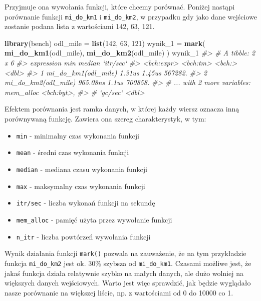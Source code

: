 \documentclass[paper=6in:9in,pagesize=pdftex,headinclude=on,footinclude=on,10pt]{scrbook}
\newenvironment{Shaded}{\begin{snugshade}}{\end{snugshade}}
\newcommand{\CommentTok}[1]{\textcolor[rgb]{0.56,0.35,0.01}{\textit{#1}}}
\newcommand{\DecValTok}[1]{\textcolor[rgb]{0.00,0.00,0.81}{#1}}
\newcommand{\KeywordTok}[1]{\textcolor[rgb]{0.13,0.29,0.53}{\textbf{#1}}}
\newcommand{\NormalTok}[1]{#1}
\newcommand{\StringTok}[1]{\textcolor[rgb]{0.31,0.60,0.02}{#1}}
\providecommand{\tightlist}{%
  \setlength{\itemsep}{0pt}\setlength{\parskip}{0pt}}
\begin{document}
Przyjmuje ona wywołania funkcji, które chcemy porównać.
Poniżej nastąpi porównanie funkcji \texttt{mi\_do\_km1} i \texttt{mi\_do\_km2}, w przypadku gdy jako dane wejściowe zostanie podana lista z wartościami 142, 63, 121.

\begin{Shaded}
\begin{Highlighting}[]
\KeywordTok{library}\NormalTok{(bench)}
\NormalTok{odl_mile =}\StringTok{ }\KeywordTok{list}\NormalTok{(}\DecValTok{142}\NormalTok{, }\DecValTok{63}\NormalTok{, }\DecValTok{121}\NormalTok{)}
\NormalTok{wynik_}\DecValTok{1}\NormalTok{ =}\StringTok{ }\KeywordTok{mark}\NormalTok{(}
  \KeywordTok{mi_do_km1}\NormalTok{(odl_mile),}
  \KeywordTok{mi_do_km2}\NormalTok{(odl_mile)}
\NormalTok{)}
\NormalTok{wynik_}\DecValTok{1}
\CommentTok{#> # A tibble: 2 x 6}
\CommentTok{#>   expression               min median `itr/sec`}
\CommentTok{#>   <bch:expr>          <bch:tm> <bch:>     <dbl>}
\CommentTok{#> 1 mi_do_km1(odl_mile)   1.31us 1.45us   567282.}
\CommentTok{#> 2 mi_do_km2(odl_mile) 965.08ns  1.1us   700858.}
\CommentTok{#> # ... with 2 more variables: mem_alloc <bch:byt>,}
\CommentTok{#> #   `gc/sec` <dbl>}
\end{Highlighting}
\end{Shaded}

Efektem porównania jest ramka danych, w której każdy wiersz oznacza inną porównywaną funkcję.
Zawiera ona szereg charakterystyk, w tym:

\begin{itemize}
\tightlist
\item
  \texttt{min} - minimalny czas wykonania funkcji
\item
  \texttt{mean} - średni czas wykonania funkcji
\item
  \texttt{median} - mediana czasu wykonania funkcji
\item
  \texttt{max} - maksymalny czas wykonania funkcji
\item
  \texttt{itr/sec} - liczba wykonań funkcji na sekundę
\item
  \texttt{mem\_alloc} - pamięć użyta przez wywołanie funkcji
\item
  \texttt{n\_itr} - liczba powtórzeń wywołania funkcji
\end{itemize}

Wynik działania funkcji \texttt{mark()} pozwala na zauważenie, że na tym przykładzie funkcja \texttt{mi\_do\_km2} jest ok. 30\% szybsza od \texttt{mi\_do\_km1}.
Czasami możliwe jest, że jakaś funkcja działa relatywnie szybko na małych danych, ale dużo wolniej na większych danych wejściowych.
Warto jest więc sprawdzić, jak będzie wyglądało nasze porównanie na większej liście, np. z wartościami od 0 do 10000 co 1.
\end{document}
